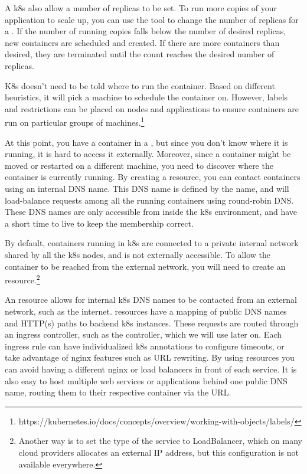 \documentclass[11pt,twoside]{article}
\begin{document}
A k8s  also allow a number of replicas to be set.  To run more copies of your application to
scale up, you can use the  tool to change the number of replicas for
a .  If the number of running copies falls below the number of desired replicas, new
containers are scheduled and created.  If there are more containers than desired, they are terminated
until the count reaches the desired number of replicas.

K8s doesn't need to be told where to run the container.  Based on different heuristics,
it will pick a machine to schedule the container on.  However, labels and restrictions can be placed
on nodes and applications to ensure containers are run on particular groups of machines.\footnote{
https://kubernetes.io/docs/concepts/overview/working-with-objects/labels/}

At this point, you have a container in a , but since you don't know
where it is running, it is hard to access it externally.
Moreover, since a container might be moved or restarted on a different machine, you need to discover
where the container is currently running.  By creating
a  resource, you can contact containers using an internal DNS name.
This DNS name is defined by the  name, and will load-balance
requests among all the running containers using round-robin DNS.  These DNS names are only accessible
from inside the k8s environment, and have a short time to live to keep the membership correct.

By default, containers running in k8s are connected to a private internal network shared by all
the k8s nodes, and is not externally accessible.  To allow the container to be reached
from the external network, you will need to create an  resource.\footnote{
Another way is to set the type of the service to LoadBalancer, which on many
cloud providers allocates an external IP address, but this configuration is not available
everywhere.}

An  resource allows for internal k8s DNS names to be contacted from an external network,
such as the internet.   resources have a mapping of public DNS names and HTTP(s) paths
to backend k8s  instances.  These requests are routed through an ingress
controller, such as the  controller, which we will use later on.
Each ingress rule can have individualized k8s annotations to configure timeouts,
or take advantage of nginx features such as URL rewriting.  By using  resources you can
avoid having a different nginx or load balancers in front of each service.
It is also easy to host multiple web services or applications behind one public DNS name,
routing them to their respective container via the URL.
\end{document}
